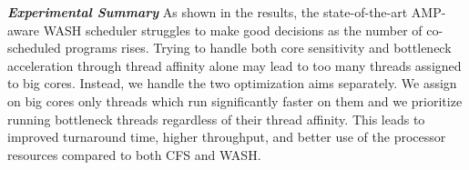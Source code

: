 \textbf{\textit{Experimental Summary}} As shown in the results, the state-of-the-art AMP-aware WASH scheduler struggles to make good decisions as the number of co-scheduled programs rises. Trying to handle both core sensitivity and bottleneck acceleration through thread affinity alone may lead to too many threads assigned to big cores. Instead, we handle the two optimization aims separately. We assign on big cores only threads which run significantly faster on them and we prioritize running bottleneck threads regardless of their thread affinity. This leads to improved turnaround time, higher throughput, and better use of the processor resources compared to both CFS and WASH.